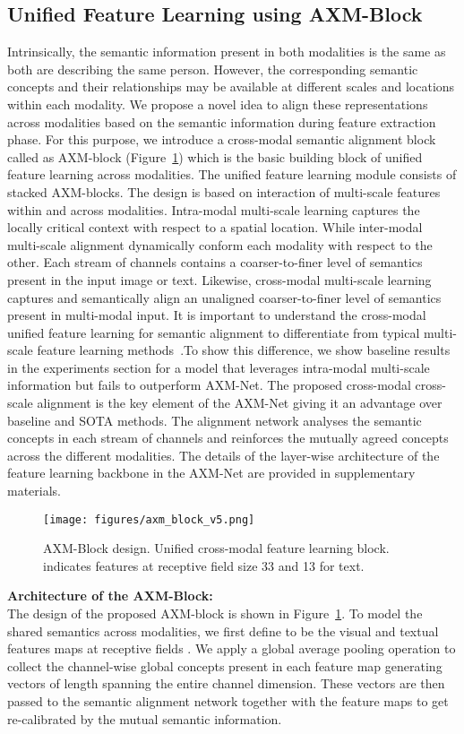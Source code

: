 \documentclass[10pt,twocolumn,letterpaper]{article}
\begin{document}
\subsection{Unified Feature Learning using AXM-Block}
Intrinsically, the semantic information present in both modalities is the same as both are describing the same person. However, the corresponding semantic concepts and their relationships may be available at different scales and locations within each modality. We propose a novel idea to align these representations across modalities based on the semantic information during feature extraction phase. For this purpose, we introduce a cross-modal semantic alignment block called as AXM-block (Figure~\ref{axm_block}) which is the basic building block of unified feature learning across modalities. The unified feature learning module consists of stacked AXM-blocks. The design is based on interaction of multi-scale features within and across modalities. Intra-modal multi-scale learning captures the locally critical context with respect to a spatial location. While inter-modal multi-scale alignment dynamically conform each modality with respect to the other. Each stream of channels contains a coarser-to-finer level of semantics present in the input image or text. Likewise, cross-modal multi-scale learning captures and semantically align an unaligned coarser-to-finer level of semantics present in multi-modal input. It is important to understand the cross-modal unified feature learning for semantic alignment to differentiate from typical multi-scale feature learning methods~\cite{zhou2019omni,chen2017person,cai2019multi}.To show this difference, we show baseline results in the experiments section for a model that leverages intra-modal multi-scale information but fails to outperform AXM-Net. The proposed cross-modal cross-scale alignment is the key element of the AXM-Net giving it an advantage over baseline and SOTA methods. The alignment network analyses the semantic concepts in each stream of channels and reinforces the mutually agreed concepts across the  different modalities. The details of the layer-wise architecture of the feature learning backbone in the AXM-Net are provided in supplementary materials.

\begin{figure}
\centering
        \texttt{[image: figures/axm\_block\_v5.png]}
        \footnotesize{\caption{AXM-Block design. Unified cross-modal feature learning block.  indicates features at receptive field size 33 and 13 for text.}
        \label{axm_block}}
\end{figure}
\noindent\textbf{Architecture of the AXM-Block:}\\ 
\noindent The design of the proposed AXM-block is shown in Figure~\ref{axm_block}. To model the shared semantics across modalities, we first define  to be the visual and textual features maps at receptive fields . We apply a global average pooling operation to collect the channel-wise global concepts present in each feature map generating  vectors of length spanning the entire channel dimension. These vectors are then passed to the semantic alignment network together with the feature maps to get re-calibrated by the mutual semantic information. 
\end{document}
